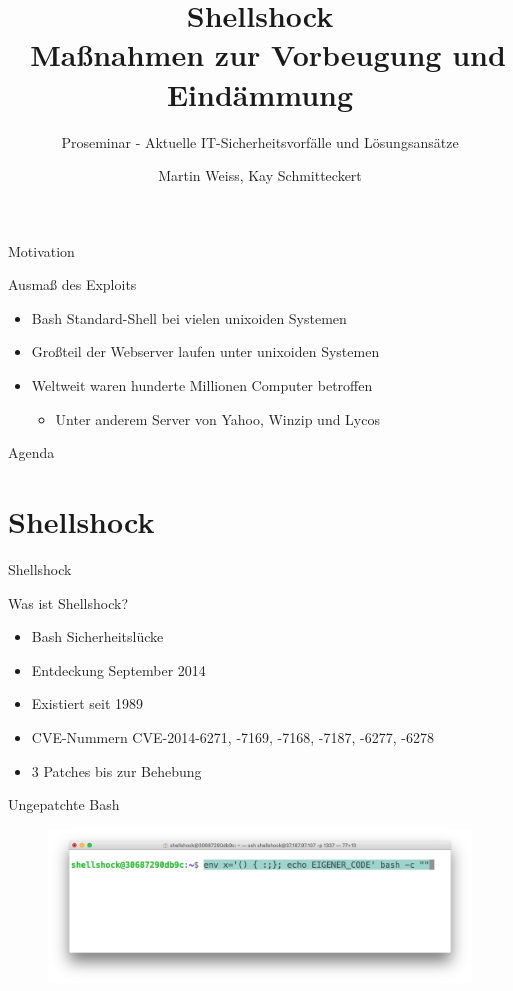\documentclass[handout]{beamer}
\title[Shellshock]{Shellshock \\ Ma{\ss}nahmen zur Vorbeugung und Eind\"ammung}
\subtitle{Proseminar - Aktuelle IT-Sicherheitsvorf\"alle und L\"osungsans\"atze}
\author{Martin Weiss, Kay Schmitteckert}
\institute{Forschungsgruppe Dezentrale Systeme und Netzdienste - TM \& SCC}
\begin{document}

\begin{frame}
\titlepage
\end{frame}

\begin{frame}{Motivation}
\begin{block}{Ausmaß des Exploits}
\begin{itemize}[<+->]
\item Bash Standard-Shell bei vielen unixoiden Systemen
\item Großteil der Webserver laufen unter unixoiden Systemen
\item Weltweit waren hunderte Millionen Computer betroffen
\begin{itemize}
  \item Unter anderem Server von Yahoo, Winzip und Lycos
\end{itemize}
\end{itemize}
\end{block}
\end{frame}

\begin{frame}{Agenda}
\tableofcontents
\end{frame}

\section{Shellshock}
\begin{frame}{Shellshock}
\begin{block}{Was ist Shellshock?}
  \begin{itemize}[<+->]
    \item Bash Sicherheitslücke
    \item Entdeckung September 2014
    \item Existiert seit 1989
    \item CVE-Nummern CVE-2014-6271, -7169, -7168, -7187, -6277, -6278
    \item 3 Patches bis zur Behebung
  \end{itemize}
\end{block}
\end{frame}

\begin{frame}{Ungepatchte Bash}
\begin{figure}
  \centering
    \includegraphics[width=1\textwidth]{assets/example1}
\end{figure}
\end{frame}
\end{document}
